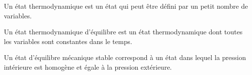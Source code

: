 \documentclass[a4paper]{article}
\begin{document}
\pagestyle{fancy}
\fancyhf{}
\setlength{\headheight}{15pt}

\begin{center}
	\large{}
\end{center}


Un état thermodynamique est un état qui peut être défini par un petit nombre de variables.

Un état thermodynamique d'équilibre est un état thermodynamique dont toutes les variables sont constantes dans le temps.

Un état d'équilibre mécanique stable correspond à un état dans lequel la pression intérieure est homogène et égale à la pression extérieure.
\end{document}
